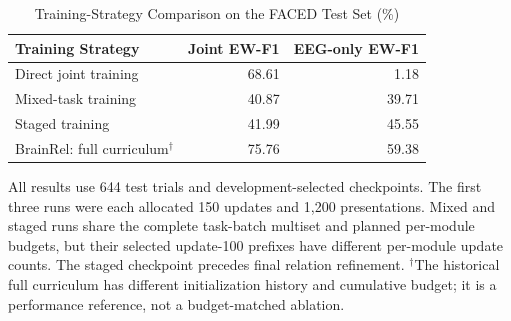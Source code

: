 \begin{table}[!t]
\centering\footnotesize
\caption{Training-Strategy Comparison on the FACED Test Set (\%)}
\label{tab:training_strategy}
\begin{tabular}{lrr}
\toprule
Training Strategy & Joint EW-F1 & EEG-only EW-F1 \\
\midrule
Direct joint training & 68.61 & 1.18 \\
Mixed-task training & 40.87 & 39.71 \\
Staged training & 41.99 & 45.55 \\
\midrule
BrainRel: full curriculum$^{\dagger}$ & 75.76 & 59.38 \\
\bottomrule
\end{tabular}
\par\smallskip\scriptsize\raggedright
All results use 644 test trials and development-selected checkpoints. The first three runs were each allocated 150 updates and 1,200 presentations. Mixed and staged runs share the complete task-batch multiset and planned per-module budgets, but their selected update-100 prefixes have different per-module update counts. The staged checkpoint precedes final relation refinement. $^{\dagger}$The historical full curriculum has different initialization history and cumulative budget; it is a performance reference, not a budget-matched ablation.
\end{table}
